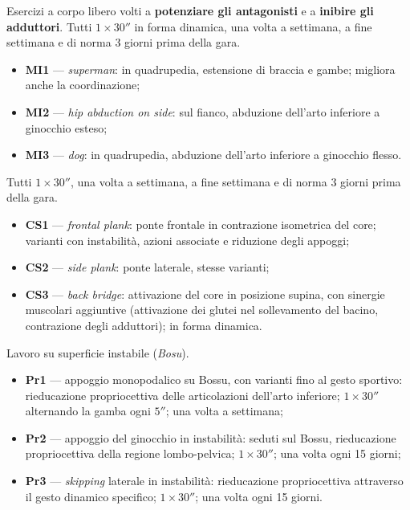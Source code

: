 Esercizi a corpo libero volti a \textbf{potenziare gli antagonisti} e a \textbf{inibire gli
adduttori}. Tutti $1 \times 30''$ in forma dinamica, una volta a settimana, a fine settimana e di
norma 3 giorni prima della gara.

\begin{itemize}
  \item \textbf{MI1} --- \textit{superman}: in quadrupedia, estensione di braccia e gambe; migliora
    anche la coordinazione;
  \item \textbf{MI2} --- \textit{hip abduction on side}: sul fianco, abduzione dell'arto inferiore
    a ginocchio esteso;
  \item \textbf{MI3} --- \textit{dog}: in quadrupedia, abduzione dell'arto inferiore a ginocchio
    flesso.
\end{itemize}

Tutti $1 \times 30''$, una volta a settimana, a fine settimana e di norma 3 giorni prima della gara.

\begin{itemize}
  \item \textbf{CS1} --- \textit{frontal plank}: ponte frontale in contrazione isometrica del core;
    varianti con instabilità, azioni associate e riduzione degli appoggi;
  \item \textbf{CS2} --- \textit{side plank}: ponte laterale, stesse varianti;
  \item \textbf{CS3} --- \textit{back bridge}: attivazione del core in posizione supina, con
    sinergie muscolari aggiuntive (attivazione dei glutei nel sollevamento del bacino, contrazione
    degli adduttori); in forma dinamica.
\end{itemize}

Lavoro su superficie instabile (\textit{Bosu}).

\begin{itemize}
  \item \textbf{Pr1} --- appoggio monopodalico su Bossu, con varianti fino al gesto sportivo:
    rieducazione propriocettiva delle articolazioni dell'arto inferiore; $1 \times 30''$ alternando
    la gamba ogni $5''$; una volta a settimana;
  \item \textbf{Pr2} --- appoggio del ginocchio in instabilità: seduti sul Bossu, rieducazione
    propriocettiva della regione lombo-pelvica; $1 \times 30''$; una volta ogni 15 giorni;
  \item \textbf{Pr3} --- \textit{skipping} laterale in instabilità: rieducazione propriocettiva
    attraverso il gesto dinamico specifico; $1 \times 30''$; una volta ogni 15 giorni.
\end{itemize}

